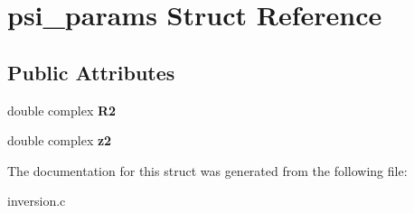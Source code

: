 \hypertarget{structpsi__params}{}\section{psi\+\_\+params Struct Reference}
\label{structpsi__params}
\subsection*{Public Attributes}
\begin{DoxyCompactItemize}
\item 
\mbox{\label{structpsi__params_a5e033b1ec4bcddc089e66a64a2f0fad1}} 
double complex {\bfseries R2}
\item 
\mbox{\label{structpsi__params_a7c4c7f6396105b901c4d5def65e67c85}} 
double complex {\bfseries z2}
\end{DoxyCompactItemize}


The documentation for this struct was generated from the following file\+:\begin{DoxyCompactItemize}
\item 
inversion.\+c\end{DoxyCompactItemize}
